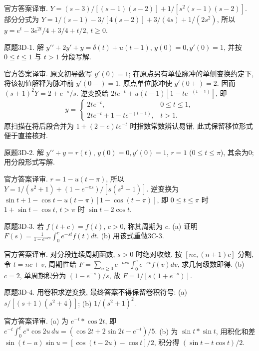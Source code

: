 \begin{solution}
官方答案译审. $Y=(s-3)/[(s-1)(s-2)]+1/[s^2(s-1)(s-2)]$. 部分分式为 $Y=1/(s-1)-3/[4(s-2)]+3/(4s)+1/(2s^2)$, 所以 $y=e^t-3e^{2t}/4+3/4+t/2$, $t\ge0$.
\end{solution}
\begin{exercise}\label{cw:bank-3D-1}
原题3D-1. 解 $y\prime\prime+2y\prime+y=\delta(t)+u(t-1)$, $y(0)=0,y\prime(0)=1$, 并按 $0\le t\le1$ 与 $t>1$ 分段写解.
\end{exercise}
\begin{solution}
官方答案译审. 原文初导数写 $y\prime(0)=1$; 在原点另有单位脉冲的单侧变换约定下, 将该初值解释为脉冲前 $y\prime(0-)=1$. 原点单位脉冲使 $y\prime(0+)=2$. 因而 $(s+1)^2Y=2+e^{-s}/s$. 逆变换给 $2te^{-t}+u(t-1)[1-te^{-(t-1)}]$, 即\[y=\begin{cases}2te^{-t},&0\le t\le1,\\2te^{-t}+1-te^{-(t-1)},&t>1.\end{cases}\]原扫描在将后段合并为 $1+(2-e)te^{-t}$ 时指数常数辨认易错, 此式保留移位形式便于直接核对.
\end{solution}
\begin{exercise}\label{cw:bank-3D-2}
原题3D-2. 解 $y\prime\prime+y=r(t)$, $y(0)=0,y\prime(0)=1$, $r=1$ ($0\le t\le\pi$), 其余为0; 用分段形式写解.
\end{exercise}
\begin{solution}
官方答案译审. $r=1-u(t-\pi)$, 所以 $Y=1/(s^2+1)+(1-e^{-\pi s})/[s(s^2+1)]$. 逆变换为 $\sin t+1-\cos t-u(t-\pi)[1-\cos(t-\pi)]$, 即 $0\le t\le\pi$ 时 $1+\sin t-\cos t$, $t>\pi$ 时 $\sin t-2\cos t$.
\end{solution}
\begin{exercise}\label{cw:bank-3D-3}
原题3D-3. 若 $f(t+c)=f(t)$, $c>0$, 称其周期为 $c$. (a) 证明 $F(s)=\frac1{1-e^{-cs}}\int_0^ce^{-st}f(t)dt$. (b) 用该式重做3C-3.
\end{exercise}
\begin{solution}
官方答案译审. 对分段连续周期函数, $s>0$ 时绝对收敛. 按 $[nc,(n+1)c]$ 分割, 令 $t=nc+v$, 周期性给 $F=\sum_{n\ge0}e^{-ncs}\int_0^ce^{-sv}f(v)dv$, 求几何级数即得. (b) $c=2$, 单周期积分为 $(1-e^{-s})/s$, 故 $F=1/[s(1+e^{-s})]$.
\end{solution}
\begin{exercise}\label{cw:bank-3D-4}
原题3D-4. 用卷积求逆变换, 最终答案不得保留卷积符号: (a) $s/[(s+1)(s^2+4)]$; (b) $1/(s^2+1)^2$.
\end{exercise}
\begin{solution}
官方答案译审. (a) 为 $e^{-t}*\cos2t$, 即 $e^{-t}\int_0^te^u\cos2u\,du=(\cos2t+2\sin2t-e^{-t})/5$. (b) 为 $\sin t*\sin t$, 用积化和差 $\sin(t-u)\sin u=[\cos(t-2u)-\cos t]/2$, 积分得 $(\sin t-t\cos t)/2$.
\end{solution}
